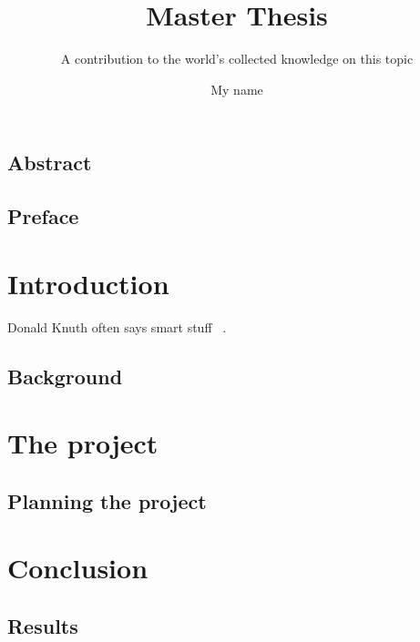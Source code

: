 \documentclass[a4paper,english]{ifimaster}
\title{Master Thesis}
\subtitle{A contribution to the world’s collected knowledge on this topic}
\author{My name}
\begin{document}
\duoforside[dept={Department of Informatics},
program={Informatics: Language and Communication},
long]

\frontmatter{}
\chapter*{Abstract}

\tableofcontents{}
\listoffigures{}
\listoftables{}

\chapter*{Preface}

\mainmatter{}
\part{Introduction}

Donald Knuth often says smart stuff ~\parencite{Knuth:2007:CPA:1283920.1283929}.

\chapter{Background}

\part{The project}

\chapter{Planning the project}

\part{Conclusion}

\chapter{Results}

\backmatter{}

\printbibliography
\end{document}
